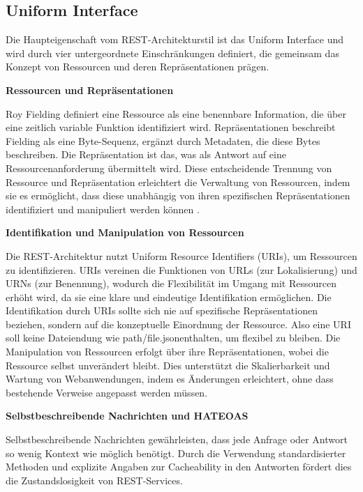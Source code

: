 \documentclass[draft,final]{vutinfth} %
\begin{document}
\subsection{Uniform Interface}

Die Haupteigenschaft vom REST-Architekturstil ist das Uniform Interface und wird durch vier untergeordnete Einschränkungen definiert, die gemeinsam das Konzept von Ressourcen und deren Repräsentationen prägen.

\textbf{{ Ressourcen und Repräsentationen}} 

Roy Fielding definiert eine Ressource als eine benennbare Information, die über eine zeitlich variable Funktion identifiziert wird. 
Repräsentationen beschreibt Fielding als eine Byte-Sequenz, ergänzt durch Metadaten, die diese Bytes beschreiben. Die Repräsentation ist das, was als Antwort auf eine Ressourcenanforderung übermittelt wird.
Diese entscheidende Trennung von Ressource und Repräsentation erleichtert die Verwaltung von Ressourcen, indem sie es ermöglicht, dass diese unabhängig von ihren spezifischen Repräsentationen identifiziert und manipuliert werden können \cite{Fielding:2000:REST}.


\textbf{{ Identifikation und Manipulation von Ressourcen}} 

Die REST-Architektur nutzt Uniform Resource Identifiers (URIs), um Ressourcen zu identifizieren. URIs vereinen die Funktionen von URLs (zur Lokalisierung) und URNs (zur Benennung), wodurch die Flexibilität im Umgang mit Ressourcen erhöht wird, da sie eine klare und eindeutige Identifikation ermöglichen. 
Die Identifikation durch URIs sollte sich nie auf spezifische Repräsentationen beziehen, sondern auf die konzeptuelle Einordnung der Ressource.
Also eine URI soll keine Dateiendung wie \grqq path/file.json\grqq enthalten, um flexibel zu bleiben.
Die Manipulation von Ressourcen erfolgt über ihre Repräsentationen, wobei die Ressource selbst unverändert bleibt. 
Dies unterstützt die Skalierbarkeit und Wartung von Webanwendungen, indem es Änderungen erleichtert, ohne dass bestehende Verweise angepasst werden müssen. \cite{Fielding:2000:REST}


\textbf{{ Selbstbeschreibende Nachrichten und HATEOAS}}

Selbstbeschreibende Nachrichten gewährleisten, dass jede Anfrage oder Antwort so wenig Kontext wie möglich benötigt. 
Durch die Verwendung standardisierter Methoden und explizite Angaben zur Cacheability in den Antworten fördert dies die Zustandslosigkeit von REST-Services.
\end{document}
